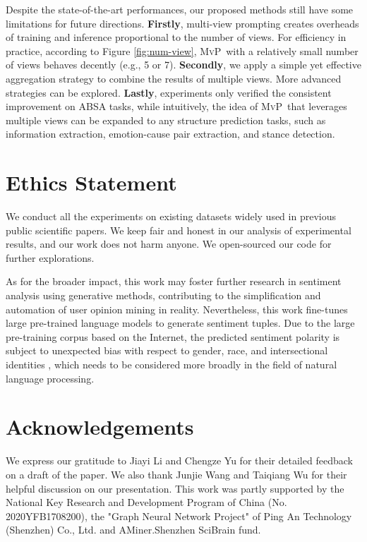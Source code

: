 \documentclass[11pt]{article}
\newcommand\mvp{\textsc{MvP}}
\begin{document}
Despite the state-of-the-art performances, our proposed methods still have some limitations for future directions.
\textbf{Firstly}, multi-view prompting creates overheads of training and inference proportional to the number of views. For efficiency in practice, according to Figure \ref{fig:num-view}, \mvp~with a relatively small number of views behaves decently (e.g., 5 or 7).
\textbf{Secondly}, we apply a simple yet effective aggregation strategy to combine the results of multiple views. More advanced strategies can be explored.
\textbf{Lastly}, experiments only verified the consistent improvement on ABSA tasks, while intuitively, the idea of \mvp~that leverages multiple views can be expanded to any structure prediction tasks, such as information extraction, emotion-cause pair extraction, and stance detection.
 

\section*{Ethics Statement}
We conduct all the experiments on existing datasets widely used in previous public scientific papers. We keep fair and honest in our analysis of experimental results, and our work does not harm anyone. We open-sourced our code for further explorations.

As for the broader impact, this work may foster further research in sentiment analysis using generative methods, contributing to the simplification and automation of user opinion mining in reality. Nevertheless, this work fine-tunes large pre-trained language models to generate sentiment tuples. Due to the large pre-training corpus based on the Internet, the predicted sentiment polarity is subject to unexpected bias with respect to gender, race, and intersectional identities \cite{tan2019assessing}, which needs to be considered more broadly in the field of natural language processing.


\section*{Acknowledgements}

We express our gratitude to Jiayi Li and Chengze Yu for their detailed feedback on a draft of the paper. We also thank Junjie Wang and Taiqiang Wu for their helpful discussion on our presentation.
This work was partly supported by the National Key Research and Development Program of China (No. 2020YFB1708200),  the "Graph Neural Network Project" of Ping An Technology (Shenzhen) Co., Ltd. and AMiner.Shenzhen SciBrain fund.
\end{document}

